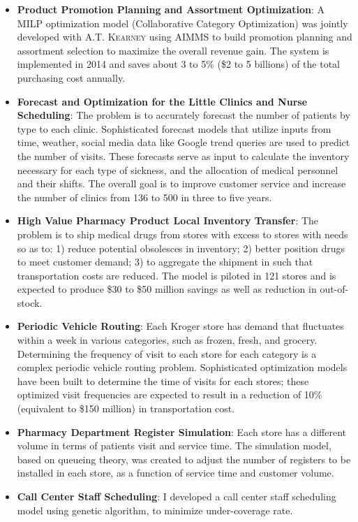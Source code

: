 \documentclass[12pt,a4paper,sans]{moderncv} %
\begin{document}
\begin{itemize}
\item \textbf{Product Promotion Planning and Assortment Optimization}: A MILP optimization model (Collaborative Category Optimization) was
jointly developed with \textsc{A.T. Kearney} using AIMMS to build promotion planning and
assortment selection to maximize the overall revenue gain.
The system is implemented in 2014 and saves about 3 to 5\% (\$2 to 5 billions) of the total purchasing cost annually.
\item \textbf{Forecast and Optimization for the Little Clinics and Nurse Scheduling}: The problem is
to accurately forecast the number of patients by type to each clinic.
Sophisticated forecast models that utilize inputs from time, weather, social
media data like Google trend queries are used to predict the number of
visits. These forecasts serve as input to calculate the inventory necessary for
each type of sickness, and the allocation of medical personnel and their
shifts. The overall goal is to improve customer service and increase the number
of clinics from 136 to 500 in three to five years.
\item \textbf{High Value Pharmacy Product Local Inventory Transfer}:  The problem is to ship 
medical drugs from stores with excess to stores with needs so as to: 1) reduce
potential obsolesces in inventory; 2) better position drugs to meet customer
demand; 3) to aggregate the shipment in such that transportation costs are
reduced. The model is piloted in 121 stores and is expected
to produce \$30 to \$50 million savings as well as reduction in
out-of-stock.

 \item \textbf{Periodic Vehicle Routing}: Each Kroger store has demand that
 fluctuates within a week in various categories, such as frozen, fresh, and
 grocery. Determining the frequency of visit to each store for each category is
 a complex periodic vehicle routing problem. Sophisticated optimization models
 have been built to determine the time of visits for each stores;  these
 optimized visit frequencies are expected to result in a reduction of 10\%
 (equivalent to \$150 million) in transportation cost.
 \item \textbf{Pharmacy Department Register Simulation}: Each store has a
 different volume in terms of patients visit and service time. The simulation
 model, based on queueing theory, was created to adjust the number of registers to be installed in
 each store, as a function of service time and customer volume.


\item \textbf{Call Center Staff Scheduling}:
I developed a call center staff scheduling model using genetic algorithm, to minimize under-coverage rate.
\end{itemize} 
 
\end{document}
